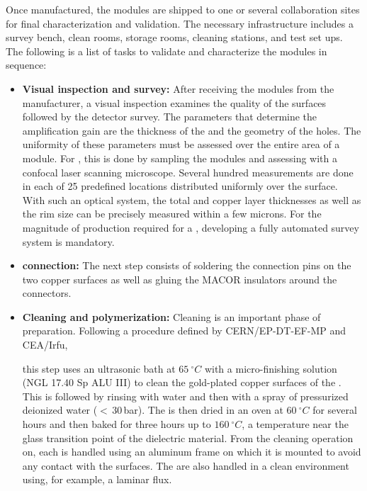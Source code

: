 Once manufactured, the  modules are shipped to one or several collaboration sites for final characterization and validation. The necessary infrastructure includes a survey bench, clean rooms, storage rooms, cleaning stations, and  test set ups. The following is a list of tasks to validate and characterize the modules in sequence:

\begin{itemize}
\item {\bf Visual inspection and survey:} After receiving the  modules from the manufacturer, a visual inspection examines the quality of the  surfaces 
followed by the detector survey. The parameters that determine the  amplification gain are the thickness of the  and the geometry of the holes. The uniformity of these parameters must be assessed over the entire area of a  module. For  , this is done by sampling the modules and assessing with a confocal laser scanning microscope. Several hundred measurements are done in each of \num{25} predefined locations distributed uniformly over the  surface. With such an optical system, the total  and copper layer thicknesses as well as the rim size can be precisely measured within a few microns.  For the magnitude of production required for a , developing a fully automated survey system is mandatory. 

\item {\bf {} connection:} The next step consists of soldering the  connection pins on the two  copper surfaces as well as gluing the MACOR insulators around the connectors.

\item {\bf Cleaning and polymerization:} Cleaning is an important phase of  preparation. Following a procedure defined by CERN/EP-DT-EF-MP and CEA/Irfu,

 this step uses an ultrasonic bath at $\SI{65}{^\circ{}C}$ with a micro-finishing solution (NGL 17.40 Sp ALU III) to clean the gold-plated copper surfaces of the . This is followed by rinsing with water and then with a spray of pressurized deionized water 
 ($<$\,30\,bar). The  is then dried in an oven 
at $\SI{60}{^\circ{}C}$  for several hours and then baked for three hours up to $\SI{160}{^\circ{}C}$,  
a temperature near the glass transition point of the dielectric material. From the cleaning operation on, each  is handled using an aluminum frame on which it is mounted to avoid any contact with the  surfaces. The  are also 
handled in a clean environment using, for example, a laminar flux.  


\end{itemize}
